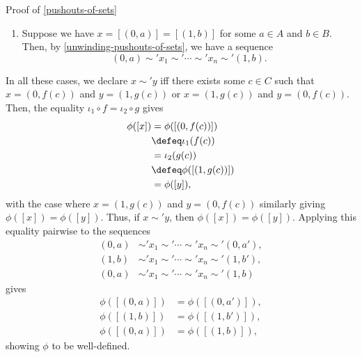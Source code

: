 \begin{Proof}{Proof of \cref{pushouts-of-sets}}
\begin{enumerate}
            \[
                (1,b)\sim'x_{1}\sim'\cdots\sim'x_{n}\sim'(1,b').%
            \]%
        \item{}Suppose we have $x=[(0,a)]=[(1,b)]$ for some $a\in A$ and $b\in B$. Then, by \cref{unwinding-pushouts-of-sets}, we have a sequence
            \[
                (0,a)\sim'x_{1}\sim'\cdots\sim'x_{n}\sim'(1,b).%
            \]%
    \end{enumerate}
    In all these cases, we declare $x\sim'y$ iff there exists some $c\in C$ such that $x=(0,f(c))$ and $y=(1,g(c))$ or $x=(1,g(c))$ and $y=(0,f(c))$. Then, the equality $\iota_{1}\circ f=\iota_{2}\circ g$ gives
    \begin{align*}
        \phi([x]) &=      \phi([(0,f(c))])\\
                  &\defeq \iota_{1}(f(c))\\
                  &=      \iota_{2}(g(c))\\
                  &\defeq \phi([(1,g(c))])\\
                  &=      \phi([y]),
    \end{align*}
    with the case where $x=(1,g(c))$ and $y=(0,f(c))$ similarly giving $\phi([x])=\phi([y])$. Thus, if $x\sim'y$, then $\phi([x])=\phi([y])$. Applying this equality pairwise to the sequences
    \begin{align*}
        (0,a)&\sim'x_{1}\sim'\cdots\sim'x_{n}\sim'(0,a'),\\%
        (1,b)&\sim'x_{1}\sim'\cdots\sim'x_{n}\sim'(1,b'),\\%
        (0,a)&\sim'x_{1}\sim'\cdots\sim'x_{n}\sim'(1,b)%
    \end{align*}
    gives
    \begin{align*}
        \phi([(0,a)]) &= \phi([(0,a')]),\\
        \phi([(1,b)]) &= \phi([(1,b')]),\\
        \phi([(0,a)]) &= \phi([(1,b)]),
    \end{align*}
    showing $\phi$ to be well-defined.
\end{Proof}
